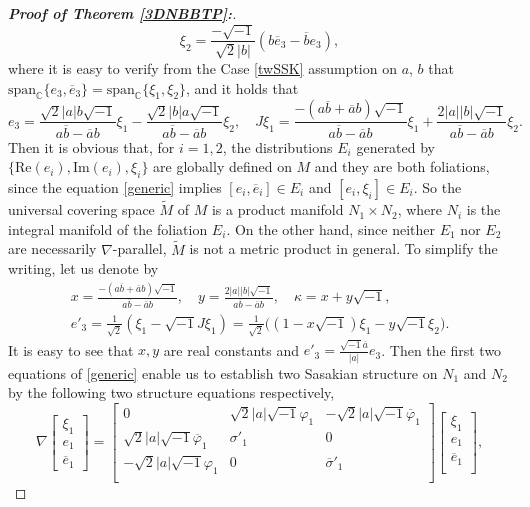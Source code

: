 \documentclass{amsart}
\numberwithin{equation}{section}
\theoremstyle{definition}
\renewcommand{\1}{\mathds{1}}
\renewcommand{\>}{\rightarrow}
\begin{document}
\begin{proof}[{\bf Proof of Theorem \ref{3DNBBTP}:}]
\[\xi_2 = \frac{- \sqrt{-1}}{\sqrt{2}|b|}(b \overline{e}_3 - \overline{b} e_3 ),\]
where it is easy to verify from the Case \eqref{twSSK} assumption on $a$, $b$ that $\mbox{span}_{\mathbb{C}} \{e_3,\overline{e}_3\} = \mbox{span}_{\mathbb{C}} \{\xi_1,\xi_2\}$, and it holds that
\[e_3 = \frac{\sqrt{2}|a|b \sqrt{-1}}{a\overline{b}-\overline{a}b} \xi_1
- \frac{\sqrt{2} |b| a \sqrt{-1}}{a\overline{b} - \overline{a} b} \xi_2,\quad
J \xi_1 = \frac{-(a\overline{b}+\overline{a}b)\sqrt{-1}}{a\overline{b}-\overline{a}b} \xi_1
+ \frac{2|a||b|\sqrt{-1}}{a\overline{b}-\overline{a}b} \xi_2. \]
Then it is obvious that, for $i=1,2$, the distributions $E_i$ generated by $\{\mathrm{Re}(e_i),\mathrm{Im}(e_i),\xi_i\}$ are globally defined on $M$ and they are both foliations, since the equation \eqref{generic} implies $[e_i,\overline{e}_i] \in E_i$ and $[e_i,\xi_i] \in E_i$.
So the universal covering space $\widetilde{M}$ of $M$ is a product manifold $N_1 \times N_2$, where $N_i$ is the integral manifold of the foliation $E_i$.
On the other hand, since neither $E_1$ nor $E_2$ are necessarily $\nabla$-parallel, $\widetilde{M}$ is not a metric product in general.
To simplify the writing, let us denote by
\begin{gather*}
x=\frac{-(a\overline{b}+\overline{a}b)\sqrt{-1}}{a\overline{b}-\overline{a}b},\quad
y=\frac{2|a||b|\sqrt{-1}}{a\overline{b}-\overline{a}b}, \quad \kappa = x + y\sqrt{-1}, \\
e'_3 = \frac{1}{\sqrt{2}}(\xi_1 - \sqrt{-1}J\xi_1)= \frac{1}{\sqrt{2}}\big((1-x\sqrt{-1})\xi_1 - y\sqrt{-1} \xi_2 \big).
\end{gather*}
It is easy to see that $x,y$ are real constants and $e'_3=\frac{\sqrt{-1} \overline{a}}{|a|}e_3$.
Then the first two equations of \eqref{generic} enable us to establish two Sasakian structure on $N_1$ and $N_2$ by the following two structure equations respectively,
\[ \nabla \! \begin{bmatrix} \xi_1 \\ e_1 \\ \overline{e}_1 \end{bmatrix}=
\begin{bmatrix} 0 & \sqrt{2}|a| \sqrt{-1} \varphi_1 & - \sqrt{2}|a| \sqrt{-1} \overline{\varphi}_1 \\
\sqrt{2}|a| \sqrt{-1} \overline{\varphi}_1 & \sigma'_1 & 0  \\
-\sqrt{2}|a| \sqrt{-1} \varphi_1  & 0 & \overline{\sigma}'_1  \\ \end{bmatrix}\!\!
\begin{bmatrix} \xi_1 \\ e_1 \\ \overline{e}_1 \\ \end{bmatrix}\!\!,\]

\end{proof}
\end{document}

